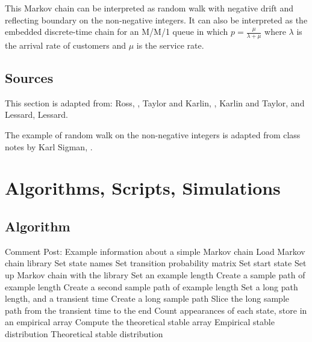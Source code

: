 \documentclass[12pt]{article}
\begin{document}
\begin{enumerate}
This Markov chain can be interpreted as random walk with negative
drift and reflecting boundary on the
non-negative integers.  It can also be interpreted as the embedded
discrete-time chain for an M/M/1 queue in which \( p =
\frac{\mu}{\lambda + \mu} \) where  \( \lambda \) is the arrival rate of
customers and \( \mu \) is the service rate.

\subsection*{Sources}

This section is adapted from:  Ross, , Taylor and Karlin, , Karlin and Taylor,  and Lessard, 
{Lessard}.

The example of random walk on the non-negative integers is adapted
from class notes by Karl Sigman,
.

\nocite{ross97}
\nocite{taylor98-introd-stoch-model}
\nocite{karlin81-secon-cours-stoch-proces}

\hr

\section*{Algorithms, Scripts, Simulations}

\subsection*{Algorithm}

\begin{codebox}
     \zi Comment Post:  Example
    information about a simple Markov chain \li Load Markov chain
    library \li Set state names \li Set transition probability matrix
    \li Set start state \li Set up Markov chain with the library \li Set
    an example length \li Create a sample path of example length \li
    Create a second sample path of example length \li Set a long path
    length, and a transient time \li Create a long sample path \li Slice
    the long sample path from the transient time to the end \li 
    Count appearances of each state, store in an empirical
    array \li Compute the theoretical stable array \li \Return Empirical
    stable distribution \li \Return Theoretical stable distribution
\end{codebox}


\end{enumerate}
\end{document}
